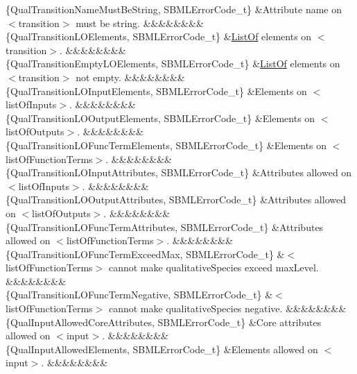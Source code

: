 \begin{DoxyParagraph}{}
\begin{longtabu}
\{Qual\+Transition\+Name\+Must\+Be\+String, S\+B\+M\+L\+Error\+Code\+\_\+t\} &Attribute \textquotesingle{}name\textquotesingle{} on {\ttfamily $<$transition$>$} must be string. &&&&&&&&\\
\{Qual\+Transition\+L\+O\+Elements, S\+B\+M\+L\+Error\+Code\+\_\+t\} &\hyperlink{class_list_of}{List\+Of} elements on {\ttfamily $<$transition$>$}. &&&&&&&&\\
\{Qual\+Transition\+Empty\+L\+O\+Elements, S\+B\+M\+L\+Error\+Code\+\_\+t\} &\hyperlink{class_list_of}{List\+Of} elements on {\ttfamily $<$transition$>$} not empty. &&&&&&&&\\
\{Qual\+Transition\+L\+O\+Input\+Elements, S\+B\+M\+L\+Error\+Code\+\_\+t\} &Elements on {\ttfamily $<$list\+Of\+Inputs$>$}. &&&&&&&&\\
\{Qual\+Transition\+L\+O\+Output\+Elements, S\+B\+M\+L\+Error\+Code\+\_\+t\} &Elements on {\ttfamily $<$list\+Of\+Outputs$>$}. &&&&&&&&\\
\{Qual\+Transition\+L\+O\+Func\+Term\+Elements, S\+B\+M\+L\+Error\+Code\+\_\+t\} &Elements on {\ttfamily $<$list\+Of\+Function\+Terms$>$}. &&&&&&&&\\
\{Qual\+Transition\+L\+O\+Input\+Attributes, S\+B\+M\+L\+Error\+Code\+\_\+t\} &Attributes allowed on {\ttfamily $<$list\+Of\+Inputs$>$}. &&&&&&&&\\
\{Qual\+Transition\+L\+O\+Output\+Attributes, S\+B\+M\+L\+Error\+Code\+\_\+t\} &Attributes allowed on {\ttfamily $<$list\+Of\+Outputs$>$}. &&&&&&&&\\
\{Qual\+Transition\+L\+O\+Func\+Term\+Attributes, S\+B\+M\+L\+Error\+Code\+\_\+t\} &Attributes allowed on {\ttfamily $<$list\+Of\+Function\+Terms$>$}. &&&&&&&&\\
\{Qual\+Transition\+L\+O\+Func\+Term\+Exceed\+Max, S\+B\+M\+L\+Error\+Code\+\_\+t\} &{\ttfamily $<$list\+Of\+Function\+Terms$>$} cannot make qualitative\+Species exceed max\+Level. &&&&&&&&\\
\{Qual\+Transition\+L\+O\+Func\+Term\+Negative, S\+B\+M\+L\+Error\+Code\+\_\+t\} &{\ttfamily $<$list\+Of\+Function\+Terms$>$} cannot make qualitative\+Species negative. &&&&&&&&\\
\{Qual\+Input\+Allowed\+Core\+Attributes, S\+B\+M\+L\+Error\+Code\+\_\+t\} &Core attributes allowed on {\ttfamily $<$input$>$}. &&&&&&&&\\
\{Qual\+Input\+Allowed\+Elements, S\+B\+M\+L\+Error\+Code\+\_\+t\} &Elements allowed on {\ttfamily $<$input$>$}. &&&&&&&&\\

\end{longtabu}
\end{DoxyParagraph}
